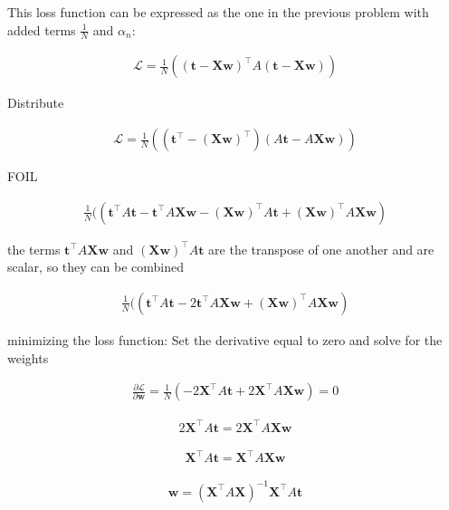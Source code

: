 \documentclass[10pt]{article}
\begin{document}
\begin{itemize}
This loss function can be expressed as the one in the previous problem with added terms $\frac{1}{N}$ and $\alpha_n$:

\begin{align*}
\mathcal{L} = \frac{1}{N} ((\mathbf{t} - \mathbf{X} \mathbf{w})^\top A (\mathbf{t} - \mathbf{X} \mathbf{w}))
\end{align*}

Distribute

\begin{align*}
\mathcal{L} = \frac{1}{N} ((\mathbf{t}^\top - (\mathbf{X} \mathbf{w})^\top)  (A\mathbf{t} - A\mathbf{X} \mathbf{w}))
\end{align*}

FOIL

\begin{align*}
\frac{1}{N} ((\mathbf{t}^\top A\mathbf{t} - \mathbf{t}^\top A\mathbf{X} \mathbf{w} - (\mathbf{X} \mathbf{w})^\top A\mathbf{t} + (\mathbf{X} \mathbf{w})^\top A\mathbf{X} \mathbf{w})
\end{align*}

the terms $\mathbf{t}^\top A\mathbf{X} \mathbf{w}$ and $(\mathbf{X} \mathbf{w})^\top A\mathbf{t}$ are the transpose of one another and are scalar, so they can be combined

\begin{align*}
\frac{1}{N} ((\mathbf{t}^\top A\mathbf{t} - 2\mathbf{t}^\top A\mathbf{X} \mathbf{w} + (\mathbf{X} \mathbf{w})^\top A\mathbf{X} \mathbf{w})
\end{align*}

minimizing the loss function: 
Set the derivative equal to zero and solve for the weights

\begin{eqnarray*}
\frac{\partial \mathcal{L}}{\partial \mathbf{w}} =
\frac{1}{N}(- 2\mathbf{X}^\top A \mathbf{t} + 2\mathbf{X}^\top A \mathbf{X} \mathbf{w}) = 0
\end{eqnarray*}

\begin{align*}
2\mathbf{X}^\top A \mathbf{t} = 2\mathbf{X}^\top A \mathbf{X} \mathbf{w}
\end{align*}

\begin{align*}
\mathbf{X}^\top A \mathbf{t} = \mathbf{X}^\top A \mathbf{X} \mathbf{w}
\end{align*}

\begin{align*}
\mathbf{w} = 
(\mathbf{X}^\top A \mathbf{X})^{-1} \mathbf{X}^\top A \mathbf{t}
\end{align*}

\end{itemize}
\end{document}
